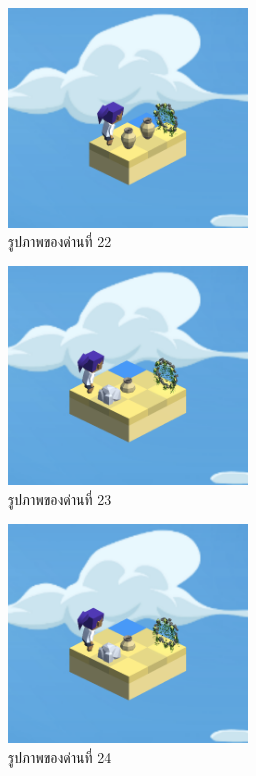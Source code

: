 \begin{figure}[H]
    \begin{center}
    \includegraphics[width=2.5in]{pic-toro/stage/s22.png}
    \end{center}
    \caption[รูปภาพของด่านที่ 22]{รูปภาพของด่านที่ 22}
    \label{s22}
\end{figure}
\begin{figure}[H]
    \begin{center}
    \includegraphics[width=2.5in]{pic-toro/stage/s23.png}
    \end{center}
    \caption[รูปภาพของด่านที่ 23]{รูปภาพของด่านที่ 23}
    \label{s23}
\end{figure}
\begin{figure}[H]
    \begin{center}
    \includegraphics[width=2.5in]{pic-toro/stage/s24.png}
    \end{center}
    \caption[รูปภาพของด่านที่ 24]{รูปภาพของด่านที่ 24}
    \label{s24}
\end{figure}
